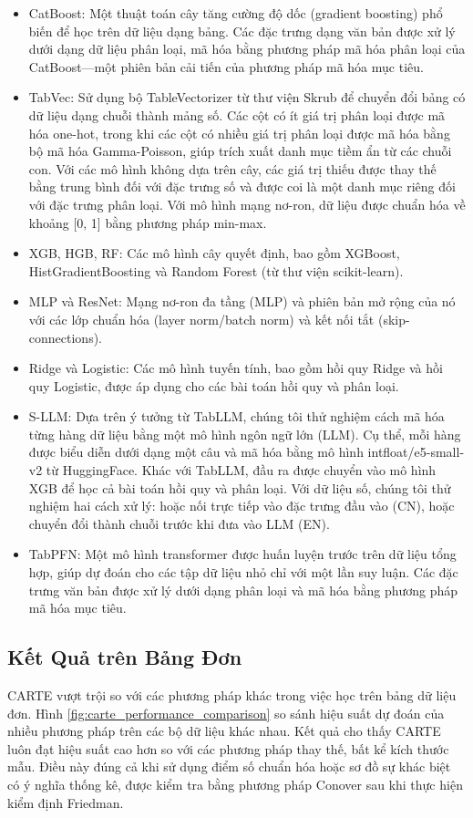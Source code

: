 \documentclass{article}
\begin{document}
\begin{itemize}
    \item CatBoost: Một thuật toán cây tăng cường độ dốc (gradient boosting) phổ biến để học trên dữ liệu dạng bảng. Các đặc trưng dạng văn bản được xử lý dưới dạng dữ liệu phân loại, mã hóa bằng phương pháp mã hóa phân loại của CatBoost—một phiên bản cải tiến của phương pháp mã hóa mục tiêu.
    \item TabVec: Sử dụng bộ TableVectorizer từ thư viện Skrub để chuyển đổi bảng có dữ liệu dạng chuỗi thành mảng số. Các cột có ít giá trị phân loại được mã hóa one-hot, trong khi các cột có nhiều giá trị phân loại được mã hóa bằng bộ mã hóa Gamma-Poisson, giúp trích xuất danh mục tiềm ẩn từ các chuỗi con. Với các mô hình không dựa trên cây, các giá trị thiếu được thay thế bằng trung bình đối với đặc trưng số và được coi là một danh mục riêng đối với đặc trưng phân loại. Với mô hình mạng nơ-ron, dữ liệu được chuẩn hóa về khoảng [0, 1] bằng phương pháp min-max.
    \item XGB, HGB, RF: Các mô hình cây quyết định, bao gồm XGBoost, HistGradientBoosting và Random Forest (từ thư viện scikit-learn).
    \item MLP và ResNet: Mạng nơ-ron đa tầng (MLP) và phiên bản mở rộng của nó với các lớp chuẩn hóa (layer norm/batch norm) và kết nối tắt (skip-connections).
    \item Ridge và Logistic: Các mô hình tuyến tính, bao gồm hồi quy Ridge và hồi quy Logistic, được áp dụng cho các bài toán hồi quy và phân loại.
    \item S-LLM: Dựa trên ý tưởng từ TabLLM, chúng tôi thử nghiệm cách mã hóa từng hàng dữ liệu bằng một mô hình ngôn ngữ lớn (LLM). Cụ thể, mỗi hàng được biểu diễn dưới dạng một câu và mã hóa bằng mô hình intfloat/e5-small-v2 từ HuggingFace. Khác với TabLLM, đầu ra được chuyển vào mô hình XGB để học cả bài toán hồi quy và phân loại. Với dữ liệu số, chúng tôi thử nghiệm hai cách xử lý: hoặc nối trực tiếp vào đặc trưng đầu vào (CN), hoặc chuyển đổi thành chuỗi trước khi đưa vào LLM (EN).
    \item TabPFN: Một mô hình transformer được huấn luyện trước trên dữ liệu tổng hợp, giúp dự đoán cho các tập dữ liệu nhỏ chỉ với một lần suy luận. Các đặc trưng văn bản được xử lý dưới dạng phân loại và mã hóa bằng phương pháp mã hóa mục tiêu.
\end{itemize}


\subsection{Kết Quả trên Bảng Đơn}
CARTE vượt trội so với các phương pháp khác trong việc học trên bảng dữ liệu đơn. Hình \ref{fig:carte_performance_comparison} so sánh hiệu suất dự đoán của nhiều phương pháp trên các bộ dữ liệu khác nhau. Kết quả cho thấy CARTE luôn đạt hiệu suất cao hơn so với các phương pháp thay thế, bất kể kích thước mẫu. Điều này đúng cả khi sử dụng điểm số chuẩn hóa hoặc sơ đồ sự khác biệt có ý nghĩa thống kê, được kiểm tra bằng phương pháp Conover sau khi thực hiện kiểm định Friedman.
\end{document}
